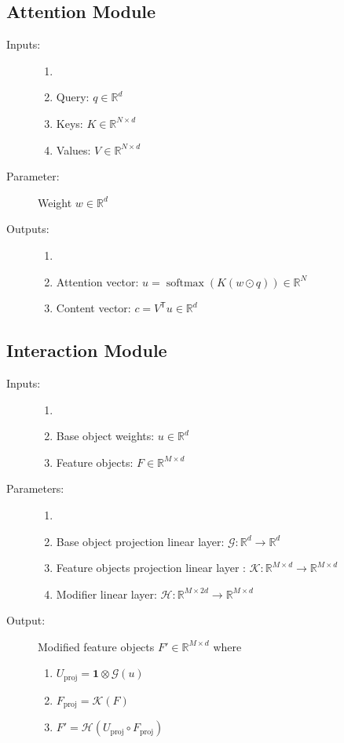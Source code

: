 \documentclass{article}
\theoremstyle{remark}
\theoremstyle{definition}
\newcommand{\Reals}{\mathbb{R}}
\newcommand{\T}{\mathsf{T}}
\DeclareMathOperator{\softmax}{\mathrm{softmax}}
\newcommand{\cG}{\mathcal{G}}
\newcommand{\cK}{\mathcal{K}}
\newcommand{\cH}{\mathcal{H}}
\newcommand{\vect}[1]{\mathbf{#1}}
\newcommand{\vone}{\vect{1}}
\newcommand{\proj}{\mathrm{proj}}
\begin{document}
\subsection{Attention Module}
\begin{description}
	\item[Inputs:] 
	\begin{enumerate}
		\item[]
		\item Query: $q \in \Reals^d$
		\item Keys: $K \in \Reals^{N \times d}$	
		\item Values: $V \in \Reals^{N \times d}$	
	\end{enumerate}

	\item[Parameter:] Weight $w \in \Reals^d$

	\item[Outputs:] 
	\begin{enumerate}
		\item[]
		\item Attention vector:  $u = \softmax(K(w \odot q)) \in \Reals^N$
		\item Content vector: $c =  V^{\T} u \in \Reals^d$
	\end{enumerate}
\end{description}

\subsection{Interaction Module}
\begin{description}
	\item[Inputs:] 
	\begin{enumerate}
		\item[]
		\item Base object weights: $u \in \Reals^d$
		\item Feature objects: $F \in \Reals^{M \times d}$	
	\end{enumerate}
	
	\item[Parameters:] 
	\begin{enumerate}
	\item[]
	\item Base object projection linear layer: $\cG: \Reals^d \to \Reals^d$
	\item Feature objects projection linear layer : $\cK: \Reals^{M \times d} \to \Reals^{M \times d}$
	\item Modifier linear layer:  $\cH: \Reals^{M \times 2d} \to \Reals^{M \times d}$	
\end{enumerate}
		
	\item[Output:] Modified feature objects $F' \in  \Reals^{M \times d}$ where
	
	\begin{enumerate}[label=\emph{\alph*})]
		\item $U_{\proj} = \vone \otimes \cG(u)$
		\item $F_{\proj} = \cK(F)$
		\item $F' = \cH(U_{\proj}  \circ F_{\proj})$
	\end{enumerate}
\end{description}
\end{document}
